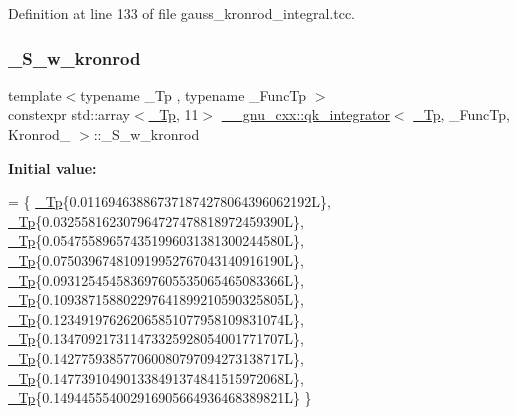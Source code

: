 Definition at line 133 of file gauss\+\_\+kronrod\+\_\+integral.\+tcc.

\mbox{\label{struct____gnu__cxx_1_1qk__integrator_3_01__Tp_00_01__FuncTp_00_01Kronrod__21_01_4_a1b750580a466d233c9eaecaa4b7694e8}} 
\subsubsection{\texorpdfstring{\+\_\+\+S\+\_\+w\+\_\+kronrod}{\_S\_w\_kronrod}}
{\footnotesize\ttfamily template$<$typename \+\_\+\+Tp , typename \+\_\+\+Func\+Tp $>$ \\
constexpr std\+::array$<$\hyperlink{namespace____gnu__cxx_a3b19a9c800ca194374ef9172290f7d79}{\+\_\+\+Tp}, 11$>$ \hyperlink{class____gnu__cxx_1_1qk__integrator}{\+\_\+\+\_\+gnu\+\_\+cxx\+::qk\+\_\+integrator}$<$ \hyperlink{namespace____gnu__cxx_a3b19a9c800ca194374ef9172290f7d79}{\+\_\+\+Tp}, \+\_\+\+Func\+Tp, Kronrod\+\_ $>$\+::\+\_\+\+S\+\_\+w\+\_\+kronrod\hspace{0.3cm}{\ttfamily [static]}}

{\bfseries Initial value\+:}
\begin{DoxyCode}
=
      \{
        \hyperlink{namespace____gnu__cxx_a3b19a9c800ca194374ef9172290f7d79}{\_Tp}\{0.011694638867371874278064396062192L\},
        \hyperlink{namespace____gnu__cxx_a3b19a9c800ca194374ef9172290f7d79}{\_Tp}\{0.032558162307964727478818972459390L\},
        \hyperlink{namespace____gnu__cxx_a3b19a9c800ca194374ef9172290f7d79}{\_Tp}\{0.054755896574351996031381300244580L\},
        \hyperlink{namespace____gnu__cxx_a3b19a9c800ca194374ef9172290f7d79}{\_Tp}\{0.075039674810919952767043140916190L\},
        \hyperlink{namespace____gnu__cxx_a3b19a9c800ca194374ef9172290f7d79}{\_Tp}\{0.093125454583697605535065465083366L\},
        \hyperlink{namespace____gnu__cxx_a3b19a9c800ca194374ef9172290f7d79}{\_Tp}\{0.109387158802297641899210590325805L\},
        \hyperlink{namespace____gnu__cxx_a3b19a9c800ca194374ef9172290f7d79}{\_Tp}\{0.123491976262065851077958109831074L\},
        \hyperlink{namespace____gnu__cxx_a3b19a9c800ca194374ef9172290f7d79}{\_Tp}\{0.134709217311473325928054001771707L\},
        \hyperlink{namespace____gnu__cxx_a3b19a9c800ca194374ef9172290f7d79}{\_Tp}\{0.142775938577060080797094273138717L\},
        \hyperlink{namespace____gnu__cxx_a3b19a9c800ca194374ef9172290f7d79}{\_Tp}\{0.147739104901338491374841515972068L\},
        \hyperlink{namespace____gnu__cxx_a3b19a9c800ca194374ef9172290f7d79}{\_Tp}\{0.149445554002916905664936468389821L\}
      \}
\end{DoxyCode}


